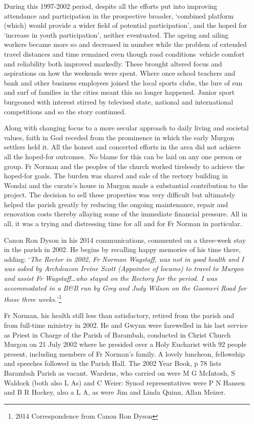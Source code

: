 During this 1997-2002 period, despite all the efforts put into improving attendance and participation in the prospective broader, `combined platform (which) would provide a wider field of potential participation', and the hoped for `increase in youth participation', neither eventuated. The ageing and ailing workers became more so and decreased in number while the problem of extended travel distances and time remained even though road conditions~vehicle comfort and reliability both improved markedly. These brought altered focus and aspirations on how the weekends were spent. Where once school teachers and bank and other business employees joined the local sports clubs, the lure of sun and surf of families in the cities meant this no longer happened. Junior sport burgeoned with interest stirred by televised state, national and international competitions and so the story continued.

Along with changing focus to a more secular approach to daily living and societal values, faith in God receded from the prominence in which the early Murgon settlers held it. All the honest and concerted efforts in the area did not achieve all the hoped-for outcomes.~No blame for this can be laid on any one person or group. Fr Norman and the peoples of the church worked tirelessly to achieve the hoped-for goals. The burden was shared and sale of the rectory building in Wondai and the curate's house in Murgon made a substantial contribution to the project. The decision to sell these properties was very difficult but ultimately helped the parish greatly by reducing the ongoing maintenance, repair and renovation costs thereby allaying some of the immediate financial pressure. All in all, it was a trying and distressing time for all and for Fr Norman in particular.

Canon Ron Dyson in his 2014 communications, commented on a three-week stay in the parish in 2002. He begins by recalling happy memories of his time there, adding: `\emph{The Rector in 2002, Fr Norman Wagstaff, was not in good health and I was asked by Archdeacon Irvine Scott (Appointee of locums) to travel to Murgon and assist Fr Wagstaff\ldots who stayed on the Rectory for the period. I was accommodated in a B\&B run by Greg and Judy Wilson on the Goomeri Road for those three weeks.}'\footnote{2014 Correspondence from Canon Ron Dyson}

Fr Norman, his health still less than satisfactory, retired from the parish and from full-time ministry in 2002. He and Gwynn were farewelled in his last service as Priest in Charge of the Parish of Barambah, conducted in Christ Church Murgon on 21 July 2002 where he presided over a Holy Eucharist with 92 people present, including members of Fr Norman's family. A lovely luncheon, fellowship and speeches followed in the Parish Hall. The 2002 Year Book, p 78 lists Barambah Parish as vacant. Wardens, who carried on were M G McIntosh, S Waldock (both also L As) and C Weier: Synod representatives were P N Hansen and B R Hockey, also a L A, as were Jim and Linda Quinn, Allan Meizer.

